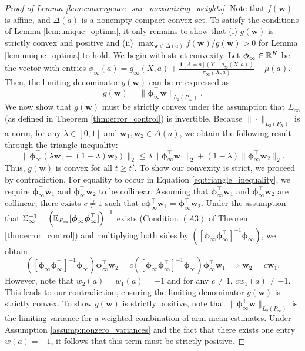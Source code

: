 \documentclass{article}
\begin{document}
\begin{appendices}
\begin{proof}[Proof of Lemma \ref{lem:convergence_snr_maximizing_weights}]
Note that $f(\bm{w})$ is affine, and $\Delta(a)$ is a nonempty compact convex set. To satisfy the conditions of Lemma \ref{lem:unique_optima}, it only remains to show that (i) $g(\bm{w})$ is strictly convex and positive and (ii) $\max_{\bm{w}\in \Delta(a)}f(\bm{w})/g(\bm{w}) >0$ for Lemma \ref{lem:unique_optima} to hold. We begin with strict convexity. Let $\boldsymbol{\phi}_\infty \in \mathbb{R}^K$ be the vector with entries ${\phi}_\infty(a) = g_\infty(X,a) + \frac{\mathbf{1}[A=a](Y - g_\infty(X,a))}{\pi_\infty(X,a)} - \mu(a)$. Then, the limiting denominator $g(\bm{w})$ can be re-expressed as 
\begin{equation}
    g(\bm{w}) =   \|\bm{\phi}_\infty^\top \bm{w}   \|_{L_2(P_\infty)}.
\end{equation}
We now show that $g(\bm{w})$ must be strictly convex under the assumption that $\Sigma_{\infty}$ (as defined in Theorem \ref{thm:error_control}) is invertible. Because $\|\cdot \|_{L_2(P_X)}$ is a norm, for any $\lambda \in [0,1]$ and $\bm{w}_1, \bm{w}_2 \in \Delta(a)$, we obtain the following result through the triangle inequality:
\begin{equation}\label{eq:triangle_inequality}
    \|\bm{\phi}_{\infty}^\top\left(\lambda \bm{w}_1 + (1-\lambda)\bm{w}_2  \right) \|_2 \leq \lambda \|\bm{\phi}_{\infty}^\top\bm{w}_1 \|_2  + (1-\lambda) \|\bm{\phi}_{\infty}^\top\bm{w}_2 \|_2.
\end{equation}
Thus, $g(\bm{w})$ is convex for all $t \geq t'$. To show our convexity is strict, we proceed by contradiction. For equality to occur in Equation \eqref{eq:triangle_inequality}, we require $\bm{\phi}_{\infty}^\top \bm{w}_1$ and $\bm{\phi}_{\infty}^\top \bm{w}_2$ to be collinear. Assuming that $\bm{\phi}_{\infty}^\top \bm{w}_1$ and $\bm{\phi}_{\infty}^\top \bm{w}_2$ are collinear, there exists $c\neq 1$ such that $c\bm{\phi}_{\infty}^\top \bm{w}_1 = \bm{\phi}_{\infty}^\top \bm{w}_2$. Under the assumption that $\Sigma_\infty^{-1} = \left(\mathbb{E}_{P_\infty}[\boldsymbol{\phi}_\infty \boldsymbol\phi_\infty^\top] \right)^{-1}$ exists (Condition $(A3)$ of Theorem \ref{thm:error_control}) and multiplying both sides by $\left( \left[\bm{\phi}_{\infty}\bm{\phi}_{\infty}^\top\right]^{-1} \bm{\phi}_{\infty} \right)$, we obtain
\begin{equation}
    \left( \left[\bm{\phi}_{\infty}\bm{\phi}_{\infty}^\top\right]^{-1} \bm{\phi}_{\infty} \right)\bm{\phi}_{\infty}^\top \bm{w}_2 = c\left( \left[\bm{\phi}_{\infty}\bm{\phi}_{\infty}^\top\right]^{-1} \bm{\phi}_{\infty} \right)\bm{\phi}_{\infty}^\top \bm{w}_1 \implies \bm{w_2} = c\bm{w}_1.
\end{equation}
However, note that $w_2(a) = w_1(a) = -1$ and for any $c\neq 1$, $cw_1(a) \neq -1$. This leads to our contradiction, ensuring the limiting denominator $g(\bm{w})$ is strictly convex. To show $g(\bm{w})$ is strictly positive, note that $\|\bm{\phi}_{\infty}^\top \bm{w} \|_{L_2(P_\infty)}$ is the limiting variance for a weighted combination of arm mean estimates. Under Assumption \ref{assump:nonzero_variances} and the fact that there exists one entry $w(a) = -1$, it follows that this term must be strictly positive. 


\end{proof}
\end{appendices}
\end{document}

